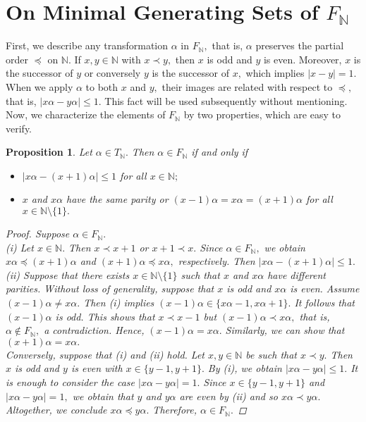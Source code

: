 \documentclass[11pt]{article}
\theoremstyle{plain}
\newtheorem{proposition}[theorem]{Proposition}
\theoremstyle{definition}
\begin{document}
\section{On Minimal Generating Sets of $F_{\mathbb{N}}$}
First, we describe any transformation $\alpha$ in $F_{\mathbb{N}},$ that is, $\alpha$ preserves the partial order $\preceq$ on $\mathbb{N}.$ If $x,y\in\mathbb{N}$ with $x\prec y,$ then $x$ is odd and $y$ is even. Moreover, $x$ is the successor of $y$ or conversely $y$ is the successor of $x,$ which implies $\left\vert x-y\right\vert=1.$ When we apply $\alpha$ to both $x$ and $y,$ their images are related with respect to $\preceq,$ that is, $\left\vert x\alpha-y\alpha\right\vert\leq 1.$ This fact will be used subsequently without mentioning. Now, we characterize the elements of $F_{\mathbb{N}}$ by two properties, which are easy to verify. 
\begin{proposition}\label{FirstProposition}
Let $\alpha\in T_{\mathbb{N}}.$ Then $\alpha\in F_{\mathbb{N}}$ if and only if
\begin{itemize}
\item[$(i)$] $\left\vert x\alpha-(x+1)\alpha \right\vert\leq 1$ for all $x\in\mathbb{N};$
\item[$(ii)$] $x$ and $x\alpha$ have the same parity or $(x-1)\alpha=x\alpha=(x+1)\alpha$ for all $x\in\mathbb{N}\setminus\{1\}.$
\end{itemize}
\begin{proof}
Suppose $\alpha\in F_{\mathbb{N}}.$\\
(i) Let $x\in\mathbb{N}.$ Then $x\prec x+1$ or $x+1\prec x.$ Since $\alpha\in F_{\mathbb{N}},$ we obtain $x\alpha\preceq (x+1)\alpha$ and $(x+1)\alpha\preceq x\alpha,$ respectively. Then $\left\vert x\alpha-(x+1)\alpha\right\vert\leq 1.$\\ (ii) Suppose that there exists $x\in\mathbb{N}\setminus\{1\}$ such that $x$ and $x\alpha$ have different parities. Without loss of generality, suppose that $x$ is odd and $x\alpha$ is even. Assume $(x-1)\alpha\not=x\alpha.$ Then (i) implies $(x-1)\alpha\in\{x\alpha-1,x\alpha+1\}.$ It follows that $(x-1)\alpha$ is odd. This shows that $x\prec x-1$ but $(x-1)\alpha\prec x\alpha,$ that is, $\alpha\not\in F_{\mathbb{N}},$ a contradiction. Hence, $(x-1)\alpha=x\alpha.$ Similarly, we can show that $(x+1)\alpha=x\alpha.$\\

Conversely, suppose that (i) and (ii) hold. Let $x,y\in\mathbb{N}$ be such that $x\prec y.$ Then $x$ is odd and $y$ is even with $x\in\{y-1,y+1\}.$ By (i), we obtain $\left\vert x\alpha-y\alpha\right\vert\leq 1.$ It is enough to consider the case $\left\vert x\alpha-y\alpha\right\vert= 1.$ Since $x\in\{y-1,y+1\}$ and $\left\vert x\alpha-y\alpha\right\vert=1,$ we obtain that $y$ and $y\alpha$ are even by (ii) and so $x\alpha\prec y\alpha.$ Altogether, we conclude $x\alpha\preceq y\alpha.$ Therefore, $\alpha\in F_{\mathbb{N}}.$
\end{proof}
\end{proposition}
\end{document}
